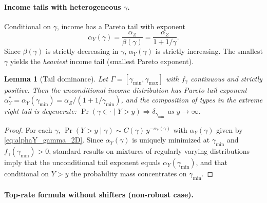\documentclass[12pt,a4paper]{article}
\theoremstyle{definition}
\theoremstyle{plain}
\newtheorem{lemma}{Lemma}[section]
\theoremstyle{remark}
\begin{document}
\paragraph{Income tails with heterogeneous $\gamma$.}

Conditional on $\gamma$, income has a Pareto tail with exponent
\begin{equation}
\label{eq:alphaY_gamma_2D}
  \alpha_Y(\gamma) = \frac{\alpha_Z}{\beta(\gamma)} = \frac{\alpha_Z}{1+1/\gamma}.
\end{equation}
Since $\beta(\gamma)$ is strictly decreasing in $\gamma$, $\alpha_Y(\gamma)$ is strictly increasing.  The smallest $\gamma$ yields the \emph{heaviest} income tail (smallest Pareto exponent).

\begin{lemma}[Tail dominance]
\label{lem:tail_dominance_2D}
Let $\Gamma = [\gamma_{\min},\gamma_{\max}]$ with $f_{\gamma}$ continuous and strictly positive.  Then the unconditional income distribution has Pareto tail exponent $\alpha_Y^* = \alpha_Y(\gamma_{\min}) = \alpha_Z/(1+1/\gamma_{\min})$, and the composition of types in the extreme right tail is degenerate: $\Pr(\gamma \in \cdot \mid Y > y) \Rightarrow \delta_{\gamma_{\min}}$ as $y \to \infty$.
\end{lemma}

\begin{proof}
For each $\gamma$, $\Pr(Y > y \mid \gamma) \sim C(\gamma)\,y^{-\alpha_Y(\gamma)}$ with $\alpha_Y(\gamma)$ given by \eqref{eq:alphaY_gamma_2D}.  Since $\alpha_Y(\gamma)$ is uniquely minimized at $\gamma_{\min}$ and $f_{\gamma}(\gamma_{\min}) > 0$, standard results on mixtures of regularly varying distributions imply that the unconditional tail exponent equals $\alpha_Y(\gamma_{\min})$, and that conditional on $Y > y$ the probability mass concentrates on $\gamma_{\min}$.
\end{proof}

\paragraph{Top-rate formula without shifters (non-robust case).}
\end{document}
